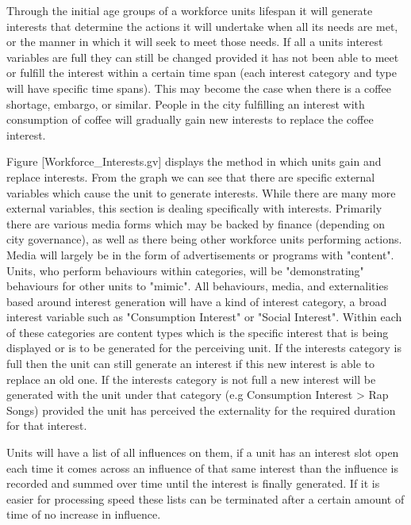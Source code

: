 Through the initial age groups of a workforce units lifespan it will generate interests that determine the actions it will undertake when all its needs are met, or the manner in which it will seek to meet those needs. If all a units interest variables are full they can still be changed provided it has not been able to meet or fulfill the interest within a certain time span (each interest category and type will have specific time spans). This may become the case when there is a coffee shortage, embargo, or similar. People in the city fulfilling an interest with consumption of coffee will gradually gain new interests to replace the coffee interest.

Figure [Workforce_Interests.gv] displays the method in which units gain and replace interests. From the graph we can see that there are specific external variables which cause the unit to generate interests. While there are many more external variables, this section is dealing specifically with interests. Primarily there are various media forms which may be backed by finance (depending on city governance), as well as there being other workforce units performing actions. Media will largely be in the form of advertisements or programs with "content". Units, who perform behaviours within categories, will be "demonstrating" behaviours for other units to "mimic". All behaviours, media, and externalities based around interest generation will have a kind of interest category, a broad interest variable such as "Consumption Interest" or "Social Interest". Within each of these categories are content types which is the specific interest that is being displayed or is to be generated for the perceiving unit. If the interests category is full then the unit can still generate an interest if this new interest is able to replace an old one. If the interests category is not full a new interest will be generated with the unit under that category (e.g Consumption Interest > Rap Songs) provided the unit has perceived the externality for the required duration for that interest.


Units will have a list of all influences on them, if a unit has an interest slot open each time it comes across an influence of that same interest than the influence is recorded and summed over time until the interest is finally generated. If it is easier for processing speed these lists can be terminated after a certain amount of time of no increase in influence.


